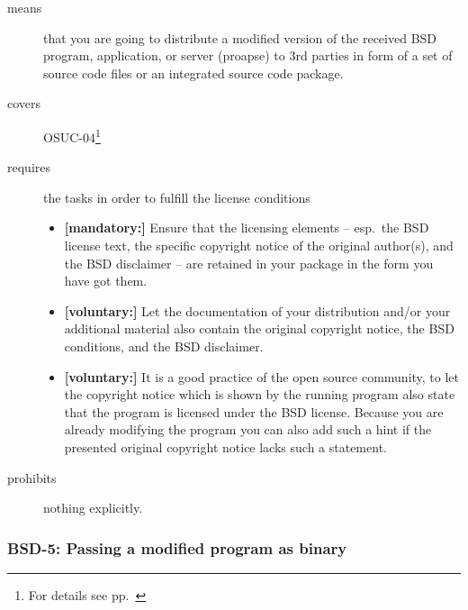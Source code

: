 \begin{description}
\item[means] that you are going to distribute a modified version of the received
BSD program, application, or server (proapse) to 3rd parties in form of a set
of source code files or an integrated source code package.
\item[covers] OSUC-04\footnote{For details see pp.\ \pageref{OSUC-04-DEF}}
\item[requires] the tasks in order to fulfill the license conditions
\begin{itemize}
  \item \textbf{[mandatory:]} Ensure that the licensing elements -- esp.\
  the BSD license text, the specific copyright notice of the original author(s),
  and the BSD disclaimer -- are retained in your package in the form you have got
  them. 
  \item \textbf{[voluntary:]} Let the documentation of your distribution
  and/or your additional material also contain the original copyright notice, the
  BSD conditions, and the BSD disclaimer.
  
  \item \textbf{[voluntary:]} It is a good practice of the open source
  community, to let the copyright notice which is shown by the running program
  also state that the program is licensed under the BSD license. Because you are
  already modifying the program you can also add such a hint if the presented
  original copyright notice lacks such a statement.
\end{itemize}
\item[prohibits] nothing explicitly.
\end{description}

\subsubsection{BSD-5: Passing a modified program as binary}

